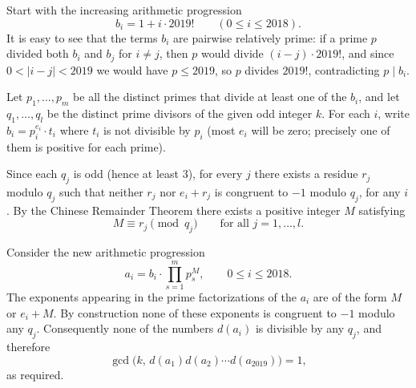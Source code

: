 Start with the increasing arithmetic progression
\[
b_i = 1 + i \cdot 2019! \qquad (0 \leq i \leq 2018).
\]
It is easy to see that the terms $b_i$ are pairwise relatively prime: if a prime $p$ divided both $b_i$ and $b_j$ for $i \neq j$, then $p$ would divide $(i-j)\cdot 2019!$, and since $0 < |i-j| < 2019$ we would have $p \leq 2019$, so $p$ divides $2019!$, contradicting $p \mid b_i$.

Let $p_1, \dots, p_m$ be all the distinct primes that divide at least one of the $b_i$, and let $q_1, \dots, q_l$ be the distinct prime divisors of the given odd integer $k$. For each $i$, write $b_i = p_i^{e_i} \cdot t_i$ where $t_i$ is not divisible by $p_i$ (most $e_i$ will be zero; precisely one of them is positive for each prime).

Since each $q_j$ is odd (hence at least $3$), for every $j$ there exists a residue $r_j$ modulo $q_j$ such that neither $r_j$ nor $e_i + r_j$ is congruent to $-1$ modulo $q_j$, for any $i$. By the Chinese Remainder Theorem there exists a positive integer $M$ satisfying
\[
M \equiv r_j \pmod{q_j} \qquad \text{for all } j = 1, \dots, l.
\]

Consider the new arithmetic progression
\[
a_i = b_i \cdot \prod_{s=1}^m p_s^{M}, \qquad 0 \leq i \leq 2018.
\]
The exponents appearing in the prime factorizations of the $a_i$ are of the form $M$ or $e_i + M$. By construction none of these exponents is congruent to $-1$ modulo any $q_j$. Consequently none of the numbers $d(a_i)$ is divisible by any $q_j$, and therefore
\[
\gcd\bigl(k,\, d(a_1)d(a_2)\cdots d(a_{2019})\bigr) = 1,
\]
as required.
